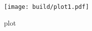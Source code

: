 \begin{figure}
    \centering
    \texttt{[image: build/plot1.pdf]}    
    \caption{plot}
    \label{plt:1}
\end{figure}
